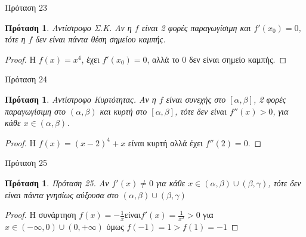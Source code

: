 \documentclass[greek]{beamer}
\newtheorem{proposition}[theorem]{Πρόταση}
\begin{document}
\begin{frame}{Πρόταση 23}
 \begin{proposition}
  \normalfont Αντίστροφο Σ.Κ. Αν η $f$ είναι 2 φορές παραγωγίσιμη  και  $f'\left( {{x}_{0}} \right)=0$, τότε η $f$ δεν είναι πάντα θέση σημείου καμπής.
 \end{proposition}
 \begin{proof}
  Η $f\left( x \right)={{x}^{4}}$, έχει $f'\left( {{x}_{0}} \right)=0$, αλλά το $0$ δεν είναι σημείο καμπής.
 \end{proof}
\end{frame}

\begin{frame}{Πρόταση 24}
 \begin{proposition}
  \normalfont Αντίστροφο Κυρτότητας. Αν η $f$ είναι συνεχής στο $\left[ \alpha ,\beta  \right]$, 2 φορές παραγωγίσιμη στο $\left( \alpha ,\beta  \right)$ και κυρτή στο $\left[ \alpha ,\beta  \right]$, τότε δεν είναι $f''\left( x  \right)>0$, για κάθε $x\in \left( \alpha ,\beta  \right)$.
 \end{proposition}
 \begin{proof}
  Η $f\left( x \right)={{\left( x-2 \right)}^{4}}+x$ είναι κυρτή αλλά έχει $f''\left( 2 \right)=0$.
 \end{proof}
\end{frame}

\begin{frame}{Πρόταση 25}
 \begin{proposition}
  \normalfont Πρόταση 25.	Αν ${f}'(x)\ne 0$ για κάθε $x\in (\alpha ,\beta )\cup (\beta ,\gamma )$, τότε δεν είναι πάντα γνησίως αύξουσα στο  $(\alpha ,\beta )\cup (\beta ,\gamma )$
 \end{proposition}
 \begin{proof}
  Η συνάρτηση $f\left( x \right)=-\frac{1}{x}$είναι${f}'\left( x \right)=\frac{1}{{{x}^{2}}}>0$
  για $x\in (-\infty ,0)\cup (0,+\infty )$ όμως $f\left( -1 \right)=1>f(1)=-1$
 \end{proof}
\end{frame}
\end{document}
